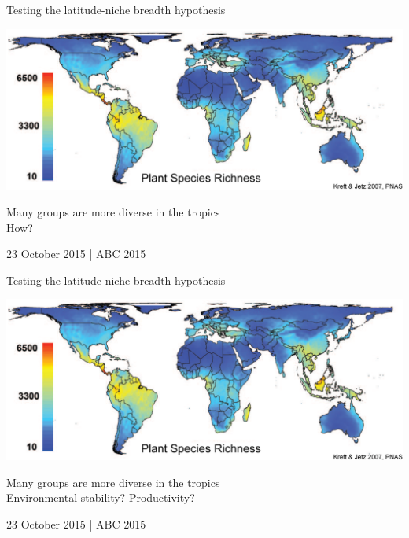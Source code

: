 \documentclass{beamer}
\begin{document}
  \begin{frame}{Testing the latitude-niche breadth hypothesis}

    \begin{center}
      \includegraphics*[width=.8\textwidth]{Figures/plant_richness.eps}

      \vspace{.5cm}

      Many groups are more diverse in the tropics\\
      \vspace{.5cm}
      {\color{white}{Ey}}How?{\color{white}{Ey}}\\

      \vspace{1cm}

      {\color{white}23 October 2015 | ABC 2015}

    \end{center}
  \end{frame}


  \begin{frame}{Testing the latitude-niche breadth hypothesis}

    \begin{center}
      \includegraphics*[width=.8\textwidth]{Figures/plant_richness.eps}

      \vspace{.5cm}

      Many groups are more diverse in the tropics\\
      \vspace{.5cm}
      Environmental stability? Productivity?\\

      \vspace{1cm}

      {\color{white}23 October 2015 | ABC 2015}

    \end{center}
  \end{frame}
\end{document}
